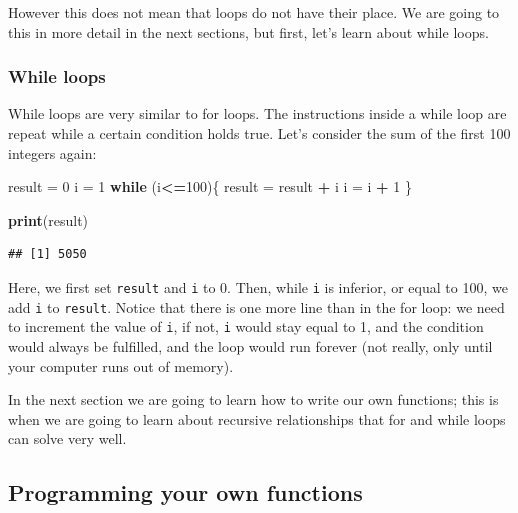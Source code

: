 \documentclass[]{gitbook}
\newenvironment{Shaded}{\begin{snugshade}}{\end{snugshade}}
\newcommand{\ControlFlowTok}[1]{\textcolor[rgb]{0.13,0.29,0.53}{\textbf{#1}}}
\newcommand{\DecValTok}[1]{\textcolor[rgb]{0.00,0.00,0.81}{#1}}
\newcommand{\KeywordTok}[1]{\textcolor[rgb]{0.13,0.29,0.53}{\textbf{#1}}}
\newcommand{\NormalTok}[1]{#1}
\newcommand{\OperatorTok}[1]{\textcolor[rgb]{0.81,0.36,0.00}{\textbf{#1}}}
\newcommand{\StringTok}[1]{\textcolor[rgb]{0.31,0.60,0.02}{#1}}
\theoremstyle{definition}
\theoremstyle{definition}
\theoremstyle{definition}
\theoremstyle{remark}
\begin{document}
However this does not mean that loops do not have their place. We are
going to this in more detail in the next sections, but first, let's
learn about while loops.

\hypertarget{while-loops}{%
\subsubsection{While loops}\label{while-loops}}

While loops are very similar to for loops. The instructions inside a
while loop are repeat while a certain condition holds true. Let's
consider the sum of the first 100 integers again:

\begin{Shaded}
\begin{Highlighting}[]
\NormalTok{result =}\StringTok{ }\DecValTok{0}
\NormalTok{i =}\StringTok{ }\DecValTok{1}
\ControlFlowTok{while}\NormalTok{ (i}\OperatorTok{<=}\DecValTok{100}\NormalTok{)\{}
\NormalTok{  result =}\StringTok{ }\NormalTok{result }\OperatorTok{+}\StringTok{ }\NormalTok{i}
\NormalTok{  i =}\StringTok{ }\NormalTok{i }\OperatorTok{+}\StringTok{ }\DecValTok{1}
\NormalTok{\}}

\KeywordTok{print}\NormalTok{(result)}
\end{Highlighting}
\end{Shaded}

\begin{verbatim}
## [1] 5050
\end{verbatim}

Here, we first set \texttt{result} and \texttt{i} to 0. Then, while
\texttt{i} is inferior, or equal to 100, we add \texttt{i} to
\texttt{result}. Notice that there is one more line than in the for
loop: we need to increment the value of \texttt{i}, if not, \texttt{i}
would stay equal to 1, and the condition would always be fulfilled, and
the loop would run forever (not really, only until your computer runs
out of memory).

In the next section we are going to learn how to write our own
functions; this is when we are going to learn about recursive
relationships that for and while loops can solve very well.

\hypertarget{programming-your-own-functions}{%
\subsection{Programming your own
functions}\label{programming-your-own-functions}}
\end{document}

